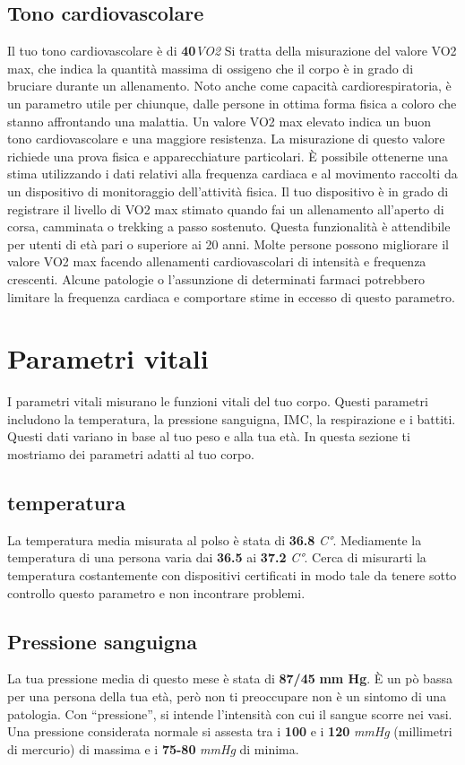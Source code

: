 \documentclass{article}
\begin{document}
\subsection{Tono cardiovascolare}
Il tuo tono cardiovascolare è di \textbf{40}\textit{VO2}
Si tratta della misurazione del valore VO2 max, che indica la quantità massima di ossigeno che il corpo è in grado di bruciare durante un allenamento. Noto anche come capacità cardiorespiratoria, è un parametro utile per chiunque, dalle persone in ottima forma fisica a coloro che stanno affrontando una malattia.
Un valore VO2 max elevato indica un buon tono cardiovascolare e una maggiore resistenza.
La misurazione di questo valore richiede una prova fisica e apparecchiature particolari. È possibile ottenerne una stima utilizzando i dati relativi alla frequenza cardiaca e al movimento raccolti da un dispositivo di monitoraggio dell'attività fisica. Il tuo dispositivo è in grado di registrare il livello di VO2 max stimato quando fai un allenamento all'aperto di corsa, camminata o trekking a passo sostenuto.
Questa funzionalità è attendibile per utenti di età pari o superiore ai 20 anni. Molte persone possono migliorare il valore VO2 max facendo allenamenti cardiovascolari di intensità e frequenza crescenti. Alcune patologie o l'assunzione di determinati farmaci potrebbero limitare la frequenza cardiaca e comportare stime in eccesso di questo parametro.

\section{Parametri vitali}

I parametri vitali misurano le funzioni vitali del tuo corpo. Questi parametri includono la temperatura, la pressione sanguigna, IMC, la respirazione e i battiti. Questi dati variano in base al tuo peso e alla tua età. In questa sezione ti mostriamo dei parametri adatti al tuo corpo.
\subsection{temperatura}
La temperatura media misurata al polso è stata di \textbf{36.8} \textit{C°}.
Mediamente la temperatura di una persona varia dai \textbf{36.5} ai \textbf{37.2} \textit{C°}. Cerca di misurarti la temperatura costantemente con dispositivi certificati in modo tale da tenere sotto controllo questo parametro e non incontrare problemi. 
\subsection{Pressione sanguigna}
La tua pressione media di questo mese è stata di \textbf{87/45} \textbf{mm Hg}. È un pò bassa per una persona della tua età, però non ti preoccupare non è un sintomo di una patologia. Con “pressione”, si intende l’intensità con cui il sangue scorre nei vasi. Una pressione considerata normale si assesta tra i \textbf{100} e i \textbf{120} \textit{mmHg} (millimetri di mercurio) di massima e i \textbf{75-80} \textit{mmHg} di minima.
\end{document}
